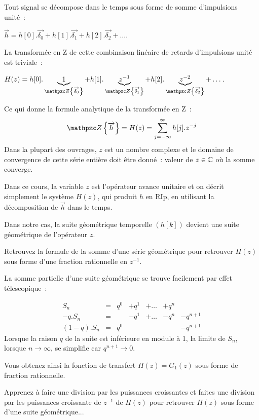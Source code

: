 \begin{remarque}
  Tout signal se décompose dans le temps sous forme de somme d'impulsions unité~:

  $\vec{h}= h[0].\vec{\delta_0} + h[1].\vec{\delta_1} + h[2].\vec{\delta_2} + \dots$.

La transformée en Z de cette combinaison linéaire de retards d'impulsions unité est triviale~:  

$H(z)= h[0].\underbrace{1}_{\tZde{\vec{\delta_0}}} + h[1].\underbrace{\zmu}_{\tZde{\vec{\delta_1}}} + h[2].\underbrace{z^{-2}}_{\tZde{\vec{\delta_2}}} + \dots$.

Ce qui donne la formule analytique de la transformée en Z~:
$$\tZde{\vec{h}} = H(z) = \sum\limits_{j=-\infty}^{\infty} h[j] . z^{-j}$$
Dans la plupart des ouvrages, $z$ est un nombre complexe et le domaine
de convergence de cette série entière doit être donné~: valeur de
$z\in\mathbb{C}$ où la somme converge.

Dans ce cours, la variable $z$ est l'opérateur avance unitaire et on décrit simplement le système $H(z)$, qui produit $h$ en RIp, en  utilisant la décomposition de $\vec{h}$ dans le temps.

\end{remarque}

Dans notre cas, la suite géométrique temporelle $\left(h[k]\right)$ devient une suite géométrique de l'opérateur $z$.

Retrouvez la formule de la somme d'une série géométrique pour
retrouver $H(z)$ sous forme d'une fraction rationnelle en $z^{-1}$.

\begin{remarque}
  La somme partielle d'une suite géométrique se trouve facilement par effet télescopique~:

\begin{equation*}
  \begin{array}{cccccccc}
    S_n       &=&   q^0     &+q^1   & +\dots &  + q^{n} &  \\
    -q.S_n     &=&         &-q^1 & +\dots & - q^{n} &- q^{n+1}  \\\hline
    (1-q).S_n &=&   q^0  &       &         &       & -q^{n+1}
  \end{array}
\end{equation*}
Lorsque la raison $q$ de la suite est inférieure en module à 1, la
limite de $S_n$, lorsque $n\to \infty$, se simplifie car $q^{n+1}\to 0$.
\end{remarque}


Vous obtenez ainsi la fonction de transfert $H(z)=G_1(z)$ sous forme de fraction rationnelle. 
\begin{remarque}
  Apprenez à faire une division par les puissances croissantes et
  faites une division par les puissances croissante de $z^{-1}$ de
  $H(z)$ pour retrouver $H(z)$ sous forme d'une suite géométrique...


\end{remarque}


